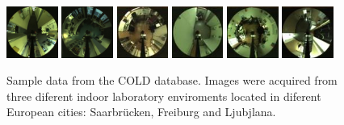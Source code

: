 \begin{figure}
\begin{center}
\includegraphics[width=0.15\textwidth]{figures/cold/Saarbruecken_CR(1).jpg}
\includegraphics[width=0.15\textwidth]{figures/cold/Saarbruecken_TR(1).jpg}
\includegraphics[width=0.15\textwidth]{figures/cold/Freiburg_1PO(1).jpg}
\includegraphics[width=0.15\textwidth]{figures/cold/Freiburg_TL(1).jpg}
\includegraphics[width=0.15\textwidth]{figures/cold/Ljubljana_LAB(1).jpg}
\includegraphics[width=0.15\textwidth]{figures/cold/Ljubljana_PA(1).jpg}
\end{center}
\caption{Sample data from the COLD database. Images were acquired from three diferent indoor laboratory enviroments located in diferent European cities: Saarbrücken, Freiburg and Ljubjlana.}
\end{figure}

